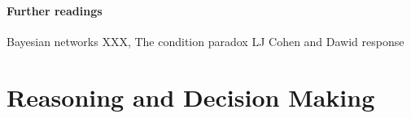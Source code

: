 \documentclass[10pt]{article}
\begin{document}
\paragraph{Further readings}
Bayesian networks XXX, The condition paradox LJ Cohen and Dawid response 






\section{Reasoning and Decision Making}
\label{sec:whenconv}
\label{sec:intexc}

\end{document}

